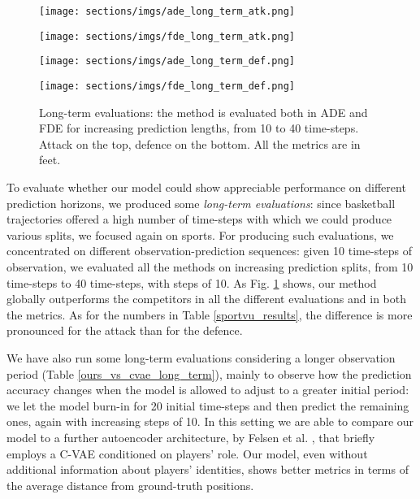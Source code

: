 \documentclass[10pt,a4paper,conference]{IEEEtran}
\begin{document}
\begin{figure}[!t]
  \centering
  \vspace{4pt}
  \begin{minipage}[b]{0.24\textwidth}
   \texttt{[image: sections/imgs/ade\_long\_term\_atk.png]}
  \end{minipage}
  \begin{minipage}[b]{0.24\textwidth}
    \texttt{[image: sections/imgs/fde\_long\_term\_atk.png]}
  \end{minipage}
  \begin{minipage}[b]{0.24\textwidth}
   \texttt{[image: sections/imgs/ade\_long\_term\_def.png]}
  \end{minipage}
  \begin{minipage}[b]{0.24\textwidth}
   \texttt{[image: sections/imgs/fde\_long\_term\_def.png]}
  \end{minipage}
  \caption{Long-term evaluations: the method is evaluated both in ADE and FDE for increasing prediction lengths, from 10 to 40 time-steps. Attack on the top, defence on the bottom. All the metrics are in feet.}
\label{fig:basketball_long_terms}   
\end{figure}

To evaluate whether our model could show appreciable performance on different prediction horizons, we produced some \textit{long-term evaluations}: since basketball trajectories offered a high number of time-steps with which we could produce various splits, we focused again on sports. For producing such evaluations, we concentrated on different observation-prediction sequences: given 10 time-steps of observation, we evaluated all the methods on increasing prediction splits, from 10 time-steps to 40 time-steps, with steps of 10. As Fig. \ref{fig:basketball_long_terms} shows, our method globally outperforms the competitors in all the different evaluations and in both the metrics. As for the numbers in Table \ref{sportvu_results}, the difference is more pronounced for the attack than for the defence.

We have also run some long-term evaluations considering a longer observation period (Table \ref{ours_vs_cvae_long_term}), mainly to observe how the prediction accuracy changes when the model is allowed to adjust to a greater initial period: we let the model burn-in for 20 initial time-steps and then predict the remaining ones, again with increasing steps of 10. In this setting we are able to compare our model to a further autoencoder architecture, by Felsen et al. \cite{where_will_they_go}, that briefly employs a C-VAE \cite{cvae2} conditioned on players' role. Our model, even without additional information about players' identities, shows better metrics in terms of the average distance from ground-truth positions.
\end{document}
